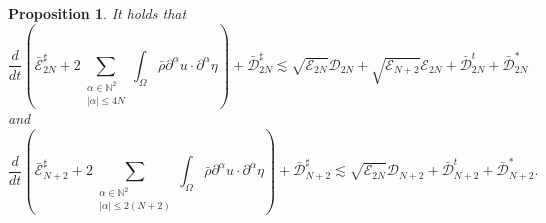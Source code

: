 \documentclass[a4paper,reqno,11pt]{amsart}
\numberwithin{equation}{section}
\providecommand{\sd}[1]{\mathcal{D}_{#1}}
\providecommand{\se}[1]{\mathcal{E}_{#1}}
\newtheorem{prop}[lem]{Proposition}
\begin{document}
\begin{prop}\label{p_upper_evolution  N'132c}
It holds that
\begin{equation}\label{p_u_e_00'132c}
\frac{d}{dt}\left(\bar{\mathcal{E}}^\sharp_{2N}+2\sum_{\substack{{\alpha}\in \mathbb{N}^2\\  |{\alpha}|\le 4N}}\int_\Omega \bar \rho  \partial^\alpha    u \cdot \partial^\alpha \eta\right)+\bar{\mathcal{D}}_{2N}^\sharp{\lesssim}\sqrt{ \se{2N}   } \sd{2N} +\sqrt{ \se{N+2} }\se{2N}+\bar{\mathcal{D}}_{2N}^t+\bar{\mathcal{D}}_{2N}^{\ast}
\end{equation}
and
\begin{equation}\label{p_u_e_00'132c2}
\frac{d}{dt}\left(\bar{\mathcal{E}}^\sharp_{N+2}+2\sum_{\substack{{\alpha}\in \mathbb{N}^2\\  |{\alpha}|\le 2(N+2)}}\int_\Omega \bar \rho  \partial^\alpha    u \cdot \partial^\alpha \eta\right)+\bar{\mathcal{D}}_{N+2}^\sharp{\lesssim}\sqrt{ \se{2N}   } \sd{N+2}+\bar{\mathcal{D}}_{N+2}^t +\bar{\mathcal{D}}_{N+2}^{\ast}.
\end{equation}
\end{prop}
\end{document}
